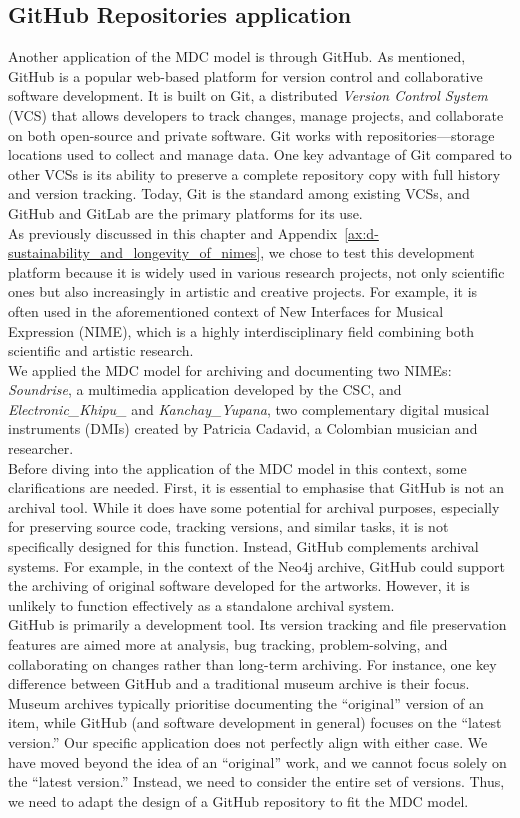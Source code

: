 \subsection{GitHub Repositories application}
Another application of the MDC model is through GitHub. As mentioned, GitHub is a popular web-based platform for version control and collaborative software development. It is built on Git, a distributed \textit{Version Control System} (VCS) that allows developers to track changes, manage projects, and collaborate on both open-source and private software. Git works with repositories—storage locations used to collect and manage data. One key advantage of Git compared to other VCSs is its ability to preserve a complete repository copy with full history and version tracking. Today, Git is the standard among existing VCSs, and GitHub and GitLab are the primary platforms for its use.\\
As previously discussed in this chapter and Appendix~\ref{ax:d-sustainability_and_longevity_of_nimes}, we chose to test this development platform because it is widely used in various research projects, not only scientific ones but also increasingly in artistic and creative projects. For example, it is often used in the aforementioned context of New Interfaces for Musical Expression (NIME), which is a highly interdisciplinary field combining both scientific and artistic research.\\
We applied the MDC model for archiving and documenting two NIMEs: \textit{Soundrise}, a multimedia application developed by the CSC, and \textit{Electronic\_Khipu\_} and \textit{Kanchay\_Yupana}, two complementary digital musical instruments (DMIs) created by Patricia Cadavid, a Colombian musician and researcher.\\
Before diving into the application of the MDC model in this context, some clarifications are needed. First, it is essential to emphasise that GitHub is not an archival tool. While it does have some potential for archival purposes, especially for preserving source code, tracking versions, and similar tasks, it is not specifically designed for this function. Instead, GitHub complements archival systems. For example, in the context of the Neo4j archive, GitHub could support the archiving of original software developed for the artworks. However, it is unlikely to function effectively as a standalone archival system.\\
GitHub is primarily a development tool. Its version tracking and file preservation features are aimed more at analysis, bug tracking, problem-solving, and collaborating on changes rather than long-term archiving. For instance, one key difference between GitHub and a traditional museum archive is their focus. Museum archives typically prioritise documenting the ``original'' version of an item, while GitHub (and software development in general) focuses on the ``latest version.'' Our specific application does not perfectly align with either case. We have moved beyond the idea of an ``original'' work, and we cannot focus solely on the ``latest version.'' Instead, we need to consider the entire set of versions. Thus, we need to adapt the design of a GitHub repository to fit the MDC model.\\
